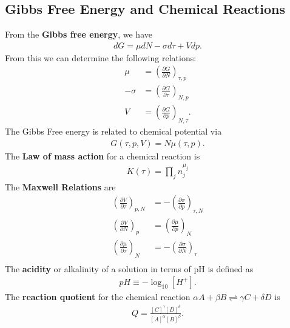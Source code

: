 \begin{multicols}{2}
	\section{Gibbs Free Energy and Chemical Reactions}
	From the \textbf{Gibbs free energy}, we have
	\begin{align}
		dG=\mu dN-\sigma d\tau + Vdp.
	\end{align}
	From this we can determine the following relations:
	\begin{align}
		\mu &= \left(\frac{\partial G}{\partial N}\right)_{\tau, p}  \\
	-\sigma &= \left(\frac{\partial G}{\partial \tau}\right)_{N, p} \\
	V &= \left(\frac{\partial G}{\partial p}\right)_{N, \tau}.
	\end{align}
	The Gibbs Free energy is related to chemical potential via
	\begin{align}
		G(\tau, p, V) = N \mu(\tau,p).
	\end{align}
	The \textbf{Law of mass action} for a chemical reaction is
	\begin{align}
		K(\tau) = \prod_{j}n_j^{\mu_j}
	\end{align}
	The \textbf{Maxwell Relations} are
	\begin{align}
		\left(\frac{\partial V}{\partial \tau}\right)_{p,N} &=	-\left(\frac{\partial \sigma}{\partial p}\right)_{\tau,N} \\
		\left(\frac{\partial V}{\partial N}\right)_p &=	\left(\frac{\partial \mu}{\partial p}\right)_N \\
		\left(\frac{\partial \mu}{\partial \tau}\right)_N &=	-\left(\frac{\partial \sigma}{\partial N}\right)_\tau \\
	\end{align}
	The \textbf{acidity} or alkalinity of a solution in terms of pH is defined as
	\begin{align}
		pH \equiv -\log_{10}[H^+].
	\end{align}
	The \textbf{reaction quotient} for the chemical reaction $\alpha A+\beta B \rightleftharpoons \gamma C + \delta D$ is
	\begin{align}
		Q = \frac{[C]^\gamma [D]^\delta}{[A]^\alpha[B]^\beta}.
	\end{align}

\end{multicols}
